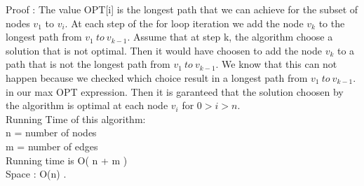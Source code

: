 \documentclass[11 pt]{article}
\begin{document}
Proof :
 The value OPT[i] is the longest path  that we can achieve for the subset of nodes $v_1$ to $v_i$. At each step of the for loop iteration we add the node $v_k$  to the longest path from $v_1  \ to \ v_{k-1}$. Assume that at step k, the algorithm choose a solution that is not optimal. Then it would have choosen to add the node $v_k$ to a path that is not the longest path from $v_1  \ to \ v_{k-1}$. We know that this can not happen because we checked which choice result in a longest path  from $v_1  \ to \ v_{k-1}$. in our max OPT expression.  Then  it is garanteed that the solution choosen by the algorithm  is optimal at each node  $v_i$ for $ 0 > i > n$. \\


 Running Time of this algorithm: \\
 n = number of nodes \\
 m = number of edges \\
 Running time  is O( n + m )  \\
 Space  : O(n) . \\
 
\end{document}
